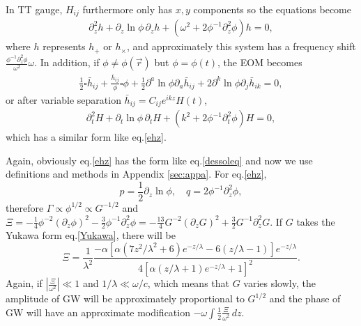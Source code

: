 \documentclass[
    jor,
    amsmath,amssymb,preprint,
    superscriptaddress,
]{revtex4-2}
\begin{document}
In TT gauge, $H_{ij}$ furthermore only has $x,y$ components so the equations become
\begin{equation}\label{ehz}
\begin{aligned}
    \partial_z^2 h+ \partial_z \ln\phi\,\partial_z h + (\omega^2 + 2\phi^{-1}\partial_z^2 \phi )h  = 0,
\end{aligned}
\end{equation}
where $h$ represents $h_+$ or $h_\times$, and approximately this system has a frequency shift $\frac{\phi^{-1}\partial_z^2\phi}{\omega^2}\omega$.
In addition, if $\phi \neq \phi(\vec{r})$ but $\phi = \phi(t)$, the EOM becomes
\begin{equation}
\begin{aligned}
\frac{1}{2}\square \bar{h}_{ij} + \frac{\bar{h}_{ij}}{\phi}\square \phi + \frac{1}{2} \partial^a \ln\phi \partial_a\bar{h}_{ij} + 2\partial^k \ln\phi\partial_j \bar{h}_{ik} = 0,
\end{aligned}
\end{equation}
or after variable separation $\bar{h}_{ij} = C_{ij}e^{ikz}H(t)$,
\begin{equation}\label{eht}
\begin{aligned}
\partial_t^2H + \partial_t\ln\phi\,\partial_tH + (k^2 + 2\phi^{-1}\partial_t^2 \phi) H = 0,
\end{aligned}
\end{equation}
which has a similar form like eq.\eqref{ehz}.

Again, obviously eq.\eqref{ehz} has the form like eq.\eqref{dessoleq} and now we use definitions and methods in Appendix \ref{sec:appa}. For eq.\eqref{ehz},
\begin{equation}
    p=\frac{1}{2}\partial_z \ln\phi,\quad q=2\phi^{-1}\partial_z^2 \phi,
\end{equation}
therefore $\Gamma\propto\phi^{1/2}\propto G^{-1/2}$ and $\Xi=-\frac{1}{4}\phi^{-2}(\partial_z\phi)^2-\frac{3}{2}\phi^{-1}\partial_z^2\phi=-\frac{13}{4}G^{-2}(\partial_zG)^2+\frac{3}{2}G^{-1}\partial_z^2G$. If $G$ takes the Yukawa form eq.\eqref{Yukawa}, there will be
\begin{equation}
    \Xi=\frac{1}{\lambda^2}\frac{-\alpha[\alpha(7z^2/\lambda^2+6)e^{-z/\lambda}-6(z/\lambda-1)]e^{-z/\lambda}}{4[\alpha(z/\lambda+1)e^{-z/\lambda}+1]^2}.
\end{equation}
Again, if $\left\lvert\frac{ \Xi}{\omega^2}\right\rvert \ll 1$ and $1/\lambda\ll\omega/c$, which means that $G$ varies slowly, the amplitude of GW will be approximately proportional to $G^{1/2}$ and the phase of GW will have an approximate modification $-\omega\int \frac{1}{2}\frac{\Xi}{\omega^2}\,d z$.
\end{document}
